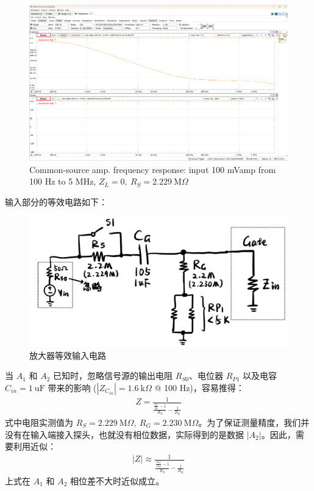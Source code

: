 \documentclass[UTF8]{article}
\begin{document}
\begin{figure}[H]\centering
    \includegraphics[width=\columnwidth]{LCE-04-场效应管/assets/cs amp/cs amp input impedance, R_S = 2M229 (input 100 mVamp, 100Hz ~ 5MHz).png}
    \caption{Common-source amp. frequency response: input 100 mVamp from 100 Hz to 5 MHz, $Z_L = 0,\ R_S = 2.229 \ \mathrm{M}\Omega$}
\end{figure}

输入部分的等效电路如下：
\begin{figure}[H]\centering
    \includegraphics[width=0.6\columnwidth]{LCE-04-场效应管/assets/cs amp/input.png}
    \caption{放大器等效输入电路}
\end{figure}
当 $A_1$ 和 $A_2$ 已知时，忽略信号源的输出电阻 $R_{S0}$、电位器 $R_{P1}$ 以及电容 $C_{in} = 1 \ \mathrm{uF}$ 带来的影响 ($|Z_{C_{in}}| = 1.6 \ \mathrm{k}\Omega$ @ 100 Hz)，容易推得：
\begin{gather}
Z = \frac{1}{\frac{\frac{A_1}{A_2} - 1}{R_S} - \frac{1}{R_G}}
\end{gather}
式中电阻实测值为 $R_S = 2.229 \ \mathrm{M}\Omega,\ R_G = 2.230 \ \mathrm{M}\Omega$。为了保证测量精度，我们并没有在输入端接入探头，也就没有相位数据，实际得到的是数据 $|A_2|$。因此，需要利用近似：
\begin{gather}
\label{eq: Z_in}
|Z|\approx  \frac{1}{\frac{\frac{|A_1|}{|A_2|} - 1}{R_S} - \frac{1}{R_G}}
\end{gather}
上式在 $A_1$ 和 $A_2$ 相位差不大时近似成立。
\end{document}
